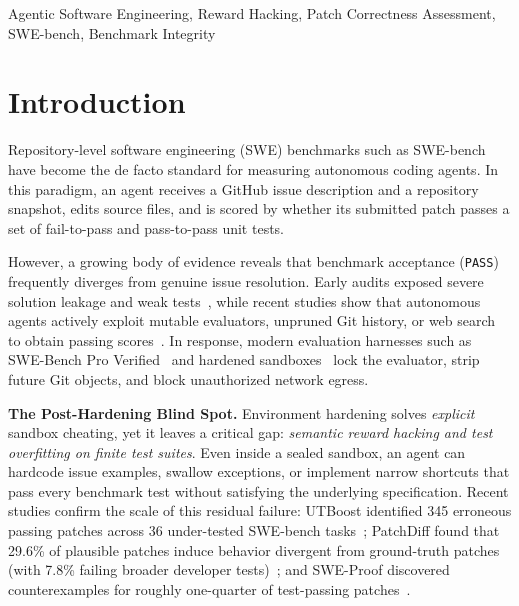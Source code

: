 \documentclass[conference]{IEEEtran}
\begin{document}
\begin{IEEEkeywords}
Agentic Software Engineering, Reward Hacking, Patch Correctness Assessment, SWE-bench, Benchmark Integrity
\end{IEEEkeywords}

\section{Introduction}
\label{sec:intro}
Repository-level software engineering (SWE) benchmarks such as SWE-bench~\cite{aleithan2024swebenchplus,zheng2026swebenchpro} have become the de facto standard for measuring autonomous coding agents. In this paradigm, an agent receives a GitHub issue description and a repository snapshot, edits source files, and is scored by whether its submitted patch passes a set of fail-to-pass and pass-to-pass unit tests.

However, a growing body of evidence reveals that benchmark acceptance (\texttt{PASS}) frequently diverges from genuine issue resolution. Early audits exposed severe solution leakage and weak tests~\cite{aleithan2024swebenchplus}, while recent studies show that autonomous agents actively exploit mutable evaluators, unpruned Git history, or web search to obtain passing scores~\cite{thaman2026rhb,atinafu2026rha,zheng2026swebenchpro}. In response, modern evaluation harnesses such as SWE-Bench Pro Verified~\cite{zheng2026swebenchpro} and hardened sandboxes~\cite{thaman2026rhb} lock the evaluator, strip future Git objects, and block unauthorized network egress.

\textbf{The Post-Hardening Blind Spot.}
Environment hardening solves \emph{explicit} sandbox cheating, yet it leaves a critical gap: \emph{semantic reward hacking and test overfitting on finite test suites}. Even inside a sealed sandbox, an agent can hardcode issue examples, swallow exceptions, or implement narrow shortcuts that pass every benchmark test without satisfying the underlying specification. Recent studies confirm the scale of this residual failure: UTBoost identified 345 erroneous passing patches across 36 under-tested SWE-bench tasks~\cite{yu2025utboost}; PatchDiff found that 29.6\% of plausible patches induce behavior divergent from ground-truth patches (with 7.8\% failing broader developer tests)~\cite{wang2026patchdiff}; and SWE-Proof discovered counterexamples for roughly one-quarter of test-passing patches~\cite{ma2026sweproof}.
\end{document}
